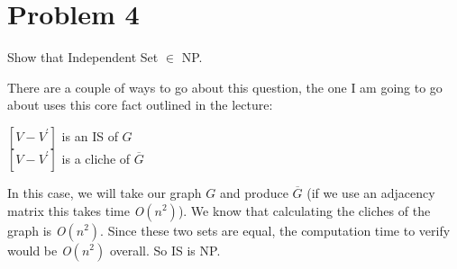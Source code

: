 \documentclass[11pt]{article}
\begin{document}
\newpage

\section*{Problem 4}

Show that Independent Set $\in$ NP.

There are a couple of ways to go about this question, the one I am going to go about uses this core fact outlined in the lecture: 
\begin{center}
    $[V-V^\prime]$ is an IS of $G$\\
    $[V-V^\prime]$ is a cliche of $\overline{G}$
\end{center}

In this case, we will take our graph $G$ and produce $\overline{G}$ (if we use an adjacency matrix this takes time {\em O}$(n^2)$). We know that calculating the cliches of the graph is {\em O}$(n^2)$. Since these two sets are equal, the computation time to verify would be {\em O}$(n^2)$ overall. So IS is NP. 
\newline
\end{document}
